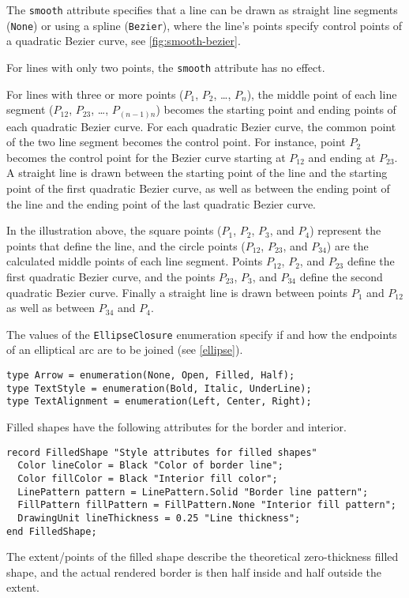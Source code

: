 The \lstinline!smooth! attribute specifies that a line can be drawn as straight line segments (\lstinline!None!) or using a spline (\lstinline!Bezier!), where the line's points specify control points of a quadratic Bezier curve, see \cref{fig:smooth-bezier}.

For lines with only two points, the \lstinline!smooth! attribute has no effect.

For lines with three or more points ($P_{1}$, $P_{2}$, \ldots{}, $P_{n}$), the middle point of each line segment ($P_{12}$, $P_{23}$, \ldots{}, $P_{(n-1)n}$) becomes the starting point and ending points of each quadratic Bezier curve.
For each quadratic Bezier curve, the common point of the two line segment becomes the control point.
For instance, point $P_{2}$ becomes the control point for the Bezier curve starting at $P_{12}$ and ending at $P_{23}$.
A straight line is drawn between the starting point of the line and the starting point of the first quadratic Bezier curve, as well as between the ending point of the line and the ending point of the last quadratic Bezier curve.

In the illustration above, the square points ($P_{1}$, $P_{2}$, $P_{3}$, and $P_{4}$) represent the points that define the line, and the circle points ($P_{12}$, $P_{23}$, and $P_{34}$) are the calculated middle points of each line segment.
Points $P_{12}$, $P_{2}$, and $P_{23}$ define the first quadratic Bezier curve, and the points $P_{23}$, $P_{3}$, and $P_{34}$ define the second quadratic Bezier curve.
Finally a straight line is drawn between points $P_{1}$ and $P_{12}$ as well as between $P_{34}$ and $P_{4}$.

The values of the \lstinline!EllipseClosure! enumeration specify if and how the endpoints of an elliptical arc are to be joined (see \cref{ellipse}).

\begin{lstlisting}[language=modelica]
type Arrow = enumeration(None, Open, Filled, Half);
type TextStyle = enumeration(Bold, Italic, UnderLine);
type TextAlignment = enumeration(Left, Center, Right);
\end{lstlisting}%

Filled shapes have the following attributes for the border and interior.
\begin{lstlisting}[language=modelica]
record FilledShape "Style attributes for filled shapes"
  Color lineColor = Black "Color of border line";
  Color fillColor = Black "Interior fill color";
  LinePattern pattern = LinePattern.Solid "Border line pattern";
  FillPattern fillPattern = FillPattern.None "Interior fill pattern";
  DrawingUnit lineThickness = 0.25 "Line thickness";
end FilledShape;
\end{lstlisting}%
The extent/points of the filled shape describe the theoretical zero-thickness filled shape, and the actual rendered border is then half inside and half outside the extent.

